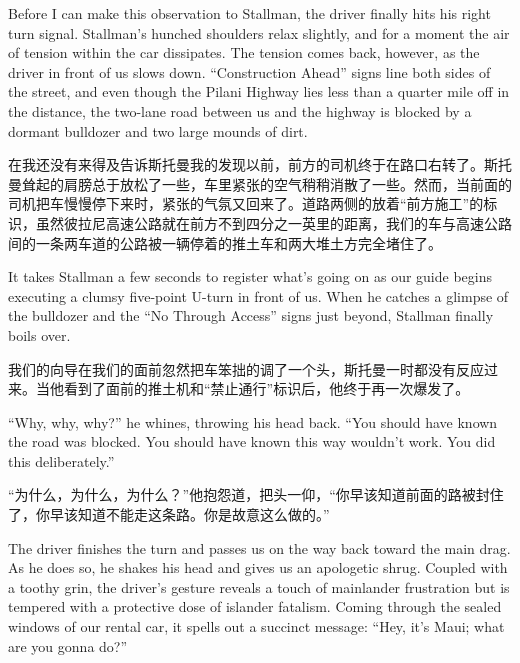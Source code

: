 \ifdefined\eng
Before I can make this observation to Stallman, the driver finally hits his right turn signal. Stallman's hunched shoulders relax slightly, and for a moment the air of tension within the car dissipates. The tension comes back, however, as the driver in front of us slows down. ``Construction Ahead'' signs line both sides of the street, and even though the Pilani Highway lies less than a quarter mile off in the distance, the two-lane road between us and the highway is blocked by a dormant bulldozer and two large mounds of dirt.
\fi

\ifdefined\chs
在我还没有来得及告诉斯托曼我的发现以前，前方的司机终于在路口右转了。斯托曼耸起的肩膀总于放松了一些，车里紧张的空气稍稍消散了一些。然而，当前面的司机把车慢慢停下来时，紧张的气氛又回来了。道路两侧的放着``前方施工''的标识，虽然彼拉尼高速公路就在前方不到四分之一英里的距离，我们的车与高速公路间的一条两车道的公路被一辆停着的推土车和两大堆土方完全堵住了。
\fi

\ifdefined\eng
It takes Stallman a few seconds to register what's going on as our guide begins executing a clumsy five-point U-turn in front of us. When he catches a glimpse of the bulldozer and the ``No Through Access'' signs just beyond, Stallman finally boils over.
\fi

\ifdefined\chs
我们的向导在我们的面前忽然把车笨拙的调了一个头，斯托曼一时都没有反应过来。当他看到了面前的推土机和``禁止通行''标识后，他终于再一次爆发了。
\fi

\ifdefined\eng
``Why, why, why?'' he whines, throwing his head back. ``You should have known the road was blocked. You should have known this way wouldn't work. You did this deliberately.''  %
\fi

\ifdefined\chs
``为什么，为什么，为什么？''他抱怨道，把头一仰，``你早该知道前面的路被封住了，你早该知道不能走这条路。你是故意这么做的。'' %
\fi

\ifdefined\eng
The driver finishes the turn and passes us on the way back toward the main drag. As he does so, he shakes his head and gives us an apologetic shrug. Coupled with a toothy grin, the driver's gesture reveals a touch of mainlander frustration but is tempered with a protective dose of islander fatalism. Coming through the sealed windows of our rental car, it spells out a succinct message: ``Hey, it's Maui; what are you gonna do?''
\fi

